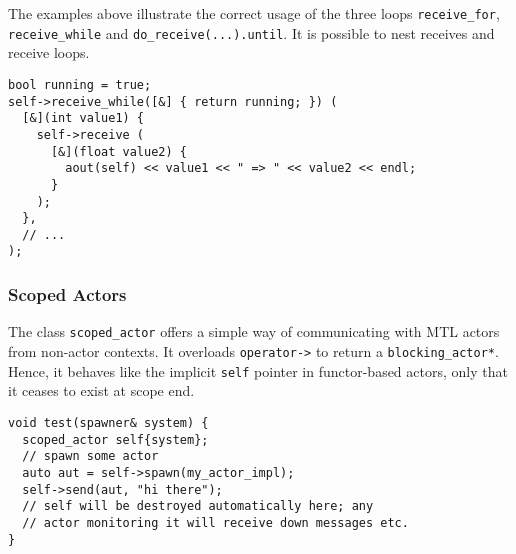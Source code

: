 The examples above illustrate the correct usage of the three loops
\lstinline^receive_for^, \lstinline^receive_while^ and
\lstinline^do_receive(...).until^. It is possible to nest receives and receive
loops.

\begin{lstlisting}
bool running = true;
self->receive_while([&] { return running; }) (
  [&](int value1) {
    self->receive (
      [&](float value2) {
        aout(self) << value1 << " => " << value2 << endl;
      }
    );
  },
  // ...
);
\end{lstlisting}

\subsubsection{Scoped Actors}
\label{scoped-actors}

The class \lstinline^scoped_actor^ offers a simple way of communicating with
MTL actors from non-actor contexts. It overloads \lstinline^operator->^ to
return a \lstinline^blocking_actor*^. Hence, it behaves like the implicit
\lstinline^self^ pointer in functor-based actors, only that it ceases to exist
at scope end.

\begin{lstlisting}
void test(spawner& system) {
  scoped_actor self{system};
  // spawn some actor
  auto aut = self->spawn(my_actor_impl);
  self->send(aut, "hi there");
  // self will be destroyed automatically here; any
  // actor monitoring it will receive down messages etc.
}
\end{lstlisting}
